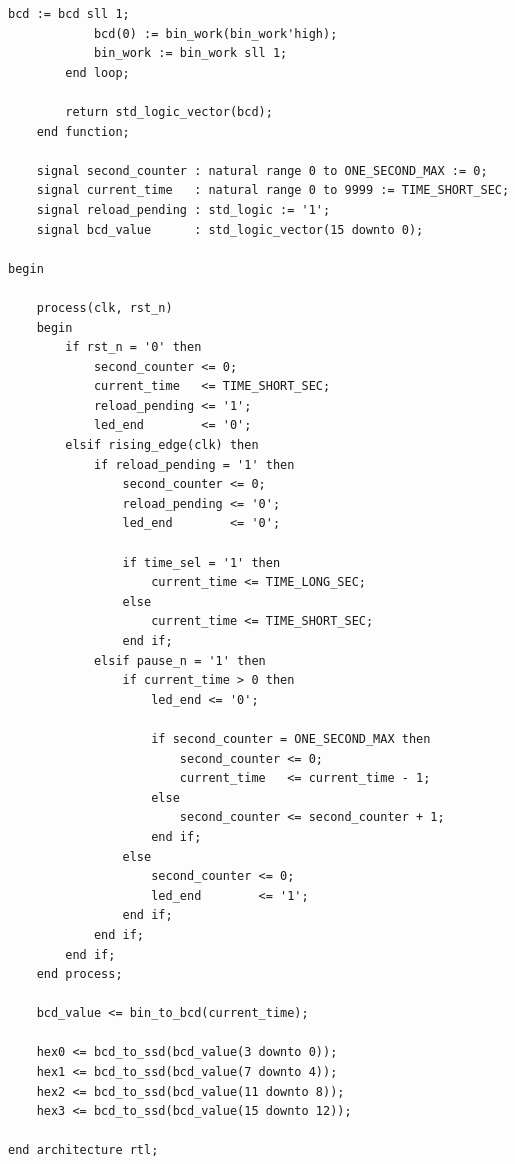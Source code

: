 \documentclass[12pt,a4paper, brazil]{article}
\begin{document}
\begin{lstlisting}[style=vhdl, caption={Arquivo \texttt{atividade\_7.vhd}.}]
            bcd := bcd sll 1;
            bcd(0) := bin_work(bin_work'high);
            bin_work := bin_work sll 1;
        end loop;

        return std_logic_vector(bcd);
    end function;

    signal second_counter : natural range 0 to ONE_SECOND_MAX := 0;
    signal current_time   : natural range 0 to 9999 := TIME_SHORT_SEC;
    signal reload_pending : std_logic := '1';
    signal bcd_value      : std_logic_vector(15 downto 0);

begin

    process(clk, rst_n)
    begin
        if rst_n = '0' then
            second_counter <= 0;
            current_time   <= TIME_SHORT_SEC;
            reload_pending <= '1';
            led_end        <= '0';
        elsif rising_edge(clk) then
            if reload_pending = '1' then
                second_counter <= 0;
                reload_pending <= '0';
                led_end        <= '0';

                if time_sel = '1' then
                    current_time <= TIME_LONG_SEC;
                else
                    current_time <= TIME_SHORT_SEC;
                end if;
            elsif pause_n = '1' then
                if current_time > 0 then
                    led_end <= '0';

                    if second_counter = ONE_SECOND_MAX then
                        second_counter <= 0;
                        current_time   <= current_time - 1;
                    else
                        second_counter <= second_counter + 1;
                    end if;
                else
                    second_counter <= 0;
                    led_end        <= '1';
                end if;
            end if;
        end if;
    end process;

    bcd_value <= bin_to_bcd(current_time);

    hex0 <= bcd_to_ssd(bcd_value(3 downto 0));
    hex1 <= bcd_to_ssd(bcd_value(7 downto 4));
    hex2 <= bcd_to_ssd(bcd_value(11 downto 8));
    hex3 <= bcd_to_ssd(bcd_value(15 downto 12));

end architecture rtl;
\end{lstlisting}
\end{document}
